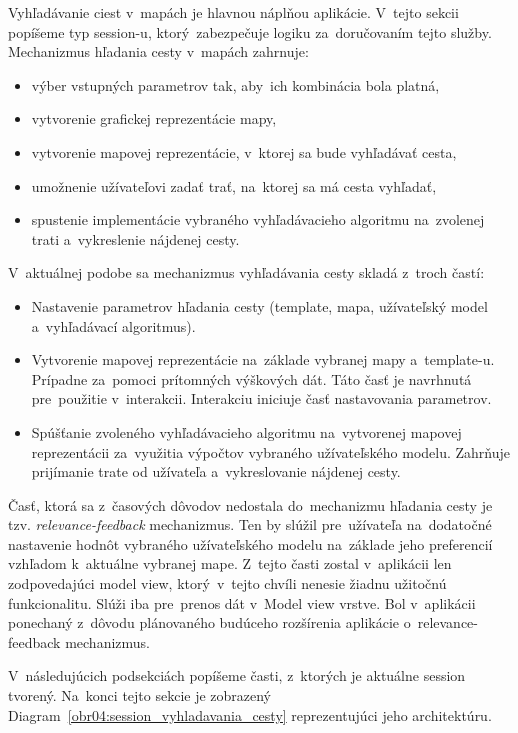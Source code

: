 Vyhľadávanie ciest v~mapách je hlavnou náplňou aplikácie. V~tejto sekcii popíšeme typ session-u, ktorý~zabezpečuje logiku za~doručovaním tejto služby. Mechanizmus hľadania cesty v~mapách zahrnuje:
\begin{itemize}
    \item výber vstupných parametrov tak, aby~ich kombinácia bola platná, 
    \item vytvorenie grafickej reprezentácie mapy,
    \item vytvorenie mapovej reprezentácie, v~ktorej sa bude vyhľadávať cesta,   
    \item umožnenie užívateľovi zadať trať, na~ktorej sa má cesta vyhľadať,
    \item spustenie implementácie vybraného vyhľadávacieho algoritmu na~zvolenej trati a~vykreslenie nájdenej cesty. 
\end{itemize} 
V~aktuálnej podobe sa mechanizmus vyhľadávania cesty skladá z~troch častí: 
\begin{itemize}
    \item Nastavenie parametrov hľadania cesty (template, mapa, užívateľský model a~vyhľadávací algoritmus).
    \item Vytvorenie mapovej reprezentácie na~základe vybranej mapy a~template-u. Prípadne za~pomoci prítomných výškových dát. Táto časť je navrhnutá pre~použitie v~interakcii. Interakciu iniciuje časť nastavovania parametrov. 
    \item Spúšťanie zvoleného vyhľadávacieho algoritmu na~vytvorenej mapovej reprezentácii za~využitia výpočtov vybraného užívateľského modelu. Zahrňuje prijímanie trate od užívateľa a~vykreslovanie nájdenej cesty.
\end{itemize} 

Časť, ktorá sa z~časových dôvodov nedostala do~mechanizmu hľadania cesty je tzv. \textit{relevance-feedback} mechanizmus. Ten by slúžil pre~užívateľa na~dodatočné nastavenie hodnôt vybraného užívateľského modelu na~základe jeho preferencií vzhľadom k~aktuálne vybranej mape. Z~tejto časti zostal v~aplikácii len zodpovedajúci model view, ktorý~v~tejto chvíli nenesie žiadnu užitočnú funkcionalitu. Slúži iba pre~prenos dát v~Model view vrstve. Bol v~aplikácii ponechaný z~dôvodu plánovaného budúceho rozšírenia aplikácie o~relevance-feedback mechanizmus.

V~následujúcich podsekciách popíšeme časti, z~ktorých je aktuálne session tvorený. Na~konci tejto sekcie je zobrazený Diagram~\ref{obr04:session_vyhladavania_cesty} reprezentujúci jeho architektúru.

